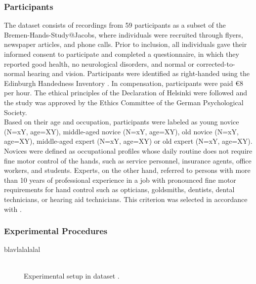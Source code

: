 \subsubsection{Participants}
The dataset consists of recordings from 59 participants as a subset of the Bremen-Hands-Study@Jacobs, where individuals were recruited through flyers, newspaper articles, and phone calls. Prior to inclusion, all individuals gave their informed consent to participate and completed a questionnaire, in which they reported good health, no neurological disorders, and normal or corrected-to-normal hearing and vision. Participants were identified as right-handed using the Edinburgh Handedness Inventory \cite{Oldfield1971}. In compensation, participants were paid \euro{8} per hour. The ethical principles of the Declaration of Helsinki were followed and the study was approved by the Ethics Committee of the German Psychological Society.\\
Based on their age and occupation, participants were labeled as young novice (N=xY, age=XY), middle-aged novice (N=xY, age=XY), old novice (N=xY, age=XY), middle-aged expert (N=xY, age=XY) or old expert (N=xY, age=XY). Novices were defined as occupational profiles whose daily routine does not require fine motor control of the hands, such as service personnel, insurance agents, office workers, and students. Experts, on the other hand, referred to persons with more than 10 years of professional experience in a job with pronounced fine motor requirements for hand control such as opticians, goldsmiths, dentists, dental technicians, or hearing aid technicians. This criterion was selected in accordance with \cite{Ericsson1991}. 

\subsubsection{Experimental Procedures}
blavlalalalal\\
\\
\begin{figure}[h]
\begin{center}

\caption[Experimental setup in dataset .]{Experimental setup in dataset .}
\label{fig:dedifferentiation}
\end{center}
\end{figure}

